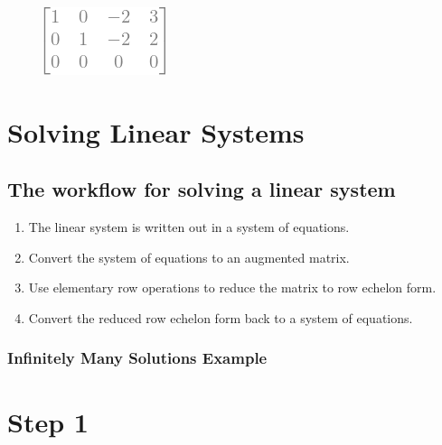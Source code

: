 \documentclass[
  letterpaper,
  DIV=11,
  numbers=noendperiod]{scrreprt}
\providecommand{\tightlist}{%
  \setlength{\itemsep}{0pt}\setlength{\parskip}{0pt}}\usepackage{longtable,booktabs,array}
\begin{document}
\begin{figure}[H]

{\centering \includegraphics{p2_files/figure-pdf/cell-4-output-1.png}

}

\end{figure}


\hypertarget{solving-linear-systems}{%
\chapter{Solving Linear Systems}\label{solving-linear-systems}}

\hypertarget{the-workflow-for-solving-a-linear-system}{%
\section*{The workflow for solving a linear
system}\label{the-workflow-for-solving-a-linear-system}}


\begin{enumerate}
\def\labelenumi{\arabic{enumi}.}
\tightlist
\item
  The linear system is written out in a system of equations.
\item
  Convert the system of equations to an augmented matrix.
\item
  Use elementary row operations to reduce the matrix to row echelon
  form.
\item
  Convert the reduced row echelon form back to a system of equations.
\end{enumerate}

\hypertarget{infinitely-many-solutions-example}{%
\subsection*{Infinitely Many Solutions
Example}\label{infinitely-many-solutions-example}}

\chapter{Step 1}
\end{document}
